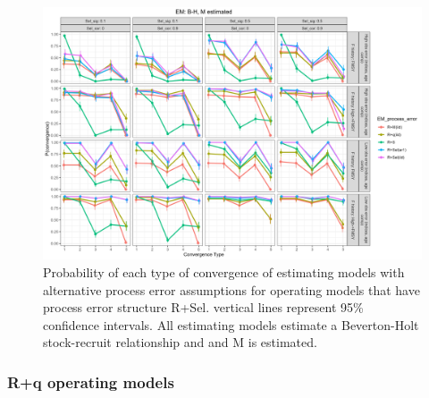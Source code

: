 \documentclass[
  12pt,
]{article}
\begin{document}
\begin{landscape}
\begin{figure}
\caption{Probability of each type of convergence of estimating models with alternative process error assumptions for operating models that have process error structure R+Sel. vertical lines represent 95\% confidence intervals. All estimating models estimate a Beverton-Holt stock-recruit relationship and and M is estimated.}\label{Sel_om_em_BH_ME_convergence}
\begin{center}
\includegraphics[width = \textwidth]{Sel_om_p_convergence_BH_M_estimated.png}
\end{center}
\end{figure}
\end{landscape}

\hypertarget{rq-operating-models}{%
\subsubsection{R+q operating models}\label{rq-operating-models}}
\end{document}
